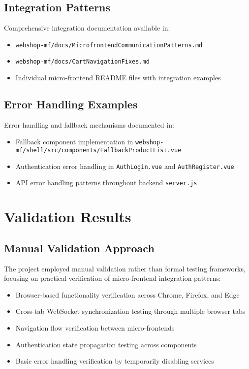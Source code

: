 \documentclass[12pt,a4paper]{report}
\begin{document}
\section{Integration Patterns}
Comprehensive integration documentation available in:
\begin{itemize}
\item \texttt{webshop-mf/docs/MicrofrontendCommunicationPatterns.md}
\item \texttt{webshop-mf/docs/CartNavigationFixes.md}
\item Individual micro-frontend README files with integration examples
\end{itemize}

\section{Error Handling Examples}
Error handling and fallback mechanisms documented in:
\begin{itemize}
\item Fallback component implementation in \texttt{webshop-mf/shell/src/components/FallbackProductList.vue}
\item Authentication error handling in \texttt{AuthLogin.vue} and \texttt{AuthRegister.vue}
\item API error handling patterns throughout backend \texttt{server.js}
\end{itemize}

\chapter{Validation Results}
\section{Manual Validation Approach}
The project employed manual validation rather than formal testing frameworks, focusing on practical verification of micro-frontend integration patterns:
\begin{itemize}
\item Browser-based functionality verification across Chrome, Firefox, and Edge
\item Cross-tab WebSocket synchronization testing through multiple browser tabs
\item Navigation flow verification between micro-frontends
\item Authentication state propagation testing across components
\item Basic error handling verification by temporarily disabling services
\end{itemize}
\end{document}

